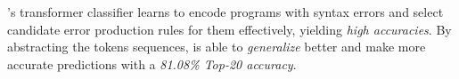 \begin{framed}
  \noindent \toolname's transformer classifier learns to encode programs with
  syntax errors and select candidate error production rules for them
  effectively, yielding \emph{high accuracies}. By abstracting the tokens
  sequences, \toolname is able to \emph{generalize} better and make more
  accurate predictions with a \emph{81.08\% Top-20 accuracy}.
\end{framed}







